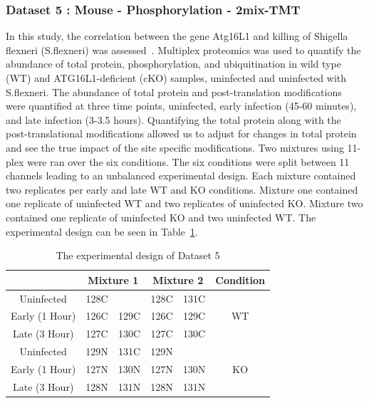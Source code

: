 \documentclass{mcp}
\begin{document}
\clearpage
\subsubsection{Dataset 5 : Mouse - Phosphorylation - 2mix-TMT}
\label{sec:shigella}

In this study, the correlation between the gene Atg16L1 and killing of Shigella flexneri (S.flexneri) was assessed~\cite{Maculins}. Multiplex proteomics was used to quantify the abundance of total protein, phosphorylation, and ubiquitination in wild type (WT) and ATG16L1-deficient (cKO) samples, uninfected and uninfected with S.flexneri. The abundance of total protein and post-translation modifications were quantified at three time points, uninfected, early infection (45-60 minutes), and late infection (3-3.5 hours). Quantifying the total protein along with the post-translational modifications allowed us to adjust for changes in total protein and see the true impact of the site specific modifications. Two mixtures using 11-plex were ran over the six conditions. The six conditions were split between 11 channels leading to an unbalanced experimental design. Each mixture contained two replicates per early and late WT and KO conditions. Mixture one contained one replicate of uninfected WT and two replicates of uninfected KO. Mixture two contained one replicate of uninfected KO and two uninfected WT. The experimental design can be seen in Table~\ref{table:shigella_design}.

\begin{table}[h!]
\centering
\begin{tabular}{|c | c c | c c | c|}
\hline
 & \multicolumn{2}{c}{Mixture 1} & \multicolumn{2}{c}{Mixture 2} & Condition \\ [0.5ex]
 \hline\hline
 Uninfected & 128C & & 128C & 131C & \\
 \hline
Early (1 Hour) & 126C & 129C & 126C & 129C & WT \\
\hline
Late (3 Hour) & 127C & 130C & 127C & 130C & \\
\hline
Uninfected & 129N & 131C & 129N & & \\
\hline
Early (1 Hour) & 127N & 130N & 127N & 130N & KO \\
\hline
Late (3 Hour) & 128N & 131N & 128N & 131N & \\
\hline

\end{tabular}
\caption{The experimental design of Dataset 5}
\label{table:shigella_design}
\end{table}
\end{document}
